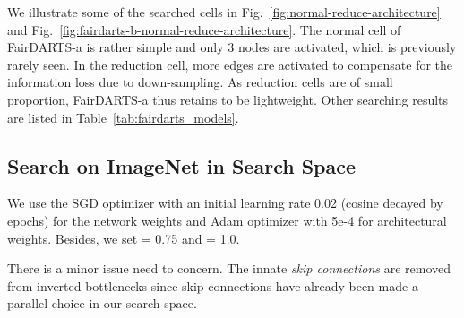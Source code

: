 \documentclass[runningheads]{llncs}
\begin{document}
We illustrate some of the searched cells in Fig.~\ref{fig:normal-reduce-architecture} and Fig.~\ref{fig:fairdarts-b-normal-reduce-architecture}. The normal cell of FairDARTS-a is rather simple and only 3 nodes are activated, which is previously rarely seen. In the reduction cell, more edges are activated to compensate for the information loss due to down-sampling. As reduction cells are of small proportion, FairDARTS-a thus retains to be lightweight. Other searching results are listed in Table~\ref{tab:fairdarts_models}.

\subsection{Search on ImageNet in Search Space }

We use the SGD optimizer with an initial learning rate 0.02 (cosine decayed by epochs) for the network weights and Adam optimizer with 5e-4 for architectural weights.   Besides, we set  = 0.75 and  = 1.0. 




There is a minor issue need to concern. The innate \emph{skip connections} are removed from inverted bottlenecks since skip connections have already been made a parallel choice in our search space.  
\end{document}
